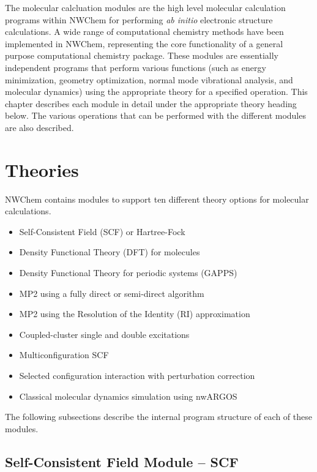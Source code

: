 
\label{sec:modules}

The molecular calcluation modules are the high level molecular
calculation programs within NWChem for performing {\em ab initio} 
electronic structure calculations.  A wide range of computational
chemistry methods have been implemented in NWChem, representing 
the core functionality of a general purpose computational chemistry 
package.  These modules are essentially independent
programs that perform various functions (such as energy minimization,
geometry optimization, normal mode vibrational analysis, and 
molecular dynamics) 
using the appropriate theory for a specified
operation.  This chapter describes each module in detail under
the appropriate theory heading below.  The various operations
that can be performed with the different modules are also described.

\section{Theories}

NWChem contains modules to support ten different theory options
for molecular calculations.  
\begin{itemize}
 \item Self-Consistent Field (SCF) or Hartree-Fock
 \item Density Functional Theory (DFT) for molecules
 \item Density Functional Theory for periodic systems (GAPPS)
 \item MP2 using a fully direct or semi-direct algorithm
 \item MP2 using the Resolution of the Identity (RI) approximation
 \item Coupled-cluster single and double excitations
 \item Multiconfiguration SCF
 \item Selected configuration interaction with perturbation
   correction 
 \item Classical molecular dynamics simulation using nwARGOS
\end{itemize}


The following subsections describe the internal program structure of each
of these modules.

\subsection{Self-Consistent Field Module -- SCF}

